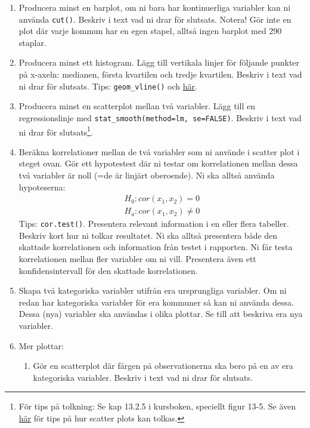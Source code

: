 \documentclass[swedish,english]{article}\usepackage[]{graphicx}\usepackage[]{xcolor}
\begin{document}
\begin{enumerate}
\item Producera minst en barplot, om ni bara har kontinuerliga variabler
kan ni använda \texttt{cut()}. Beskriv i text vad ni drar för slutsats.
Notera! Gör inte en plot där varje kommun har en egen stapel, alltså
ingen barplot med 290 staplar.
\item Producera minst ett histogram. Lägg till vertikala linjer för följande
punkter på x-axeln: medianen, första kvartilen och tredje kvartilen.
Beskriv i text vad ni drar för slutsats. Tips: \texttt{geom\_vline()}
och \href{http://www.sthda.com/english/wiki/ggplot2-add-straight-lines-to-a-plot-horizontal-vertical-and-regression-lines}{här}.
\item Producera minst en scatterplot mellan två variabler. Lägg till en
regressionslinje med \texttt{stat\_smooth(method=\textquotedbl lm\textquotedbl ,
se=FALSE)}. Beskriv i text vad ni drar för slutsats\footnote{För tips på tolkning: Se kap 13.2.5 i kursboken, speciellt figur 13-5.
Se även \href{https://chartio.com/learn/charts/what-is-a-scatter-plot/\#when-you-should-use-a-scatter-plot}{här}
för tips på hur scatter plots kan tolkas.}.
\item Beräkna korrelationer mellan de två variabler som ni använde i scatter
plot i steget ovan. Gör ett hypotestest där ni testar om korrelationen
mellan dessa två variabler är noll (=de är linjärt oberoende). Ni
ska alltså använda hypoteserna:
\[
\begin{array}{c}
H_{0}:cor\left(x_{1},x_{2}\right)=0\\
H_{a}:cor\left(x_{1},x_{2}\right)\ne0
\end{array}
\]
Tips: \texttt{cor.test()}. Presentera relevant information i en eller
flera tabeller. Beskriv kort hur ni tolkar resultatet. Ni ska alltså
presentera både den skattade korrelationen och information från testet
i rapporten. Ni får testa korrelationen mellan fler variabler om ni
vill. Presentera även ett konfidensintervall för den skattade korrelationen.
\item Skapa två kategoriska variabler utifrån era ursprungliga variabler.
Om ni redan har kategoriska variabler för era kommuner så kan ni använda
dessa. Dessa (nya) variabler ska användas i olika plottar. Se till
att beskriva era nya variabler.
\item Mer plottar:
\begin{enumerate}
\item Gör en scatterplot där färgen på observationerna ska bero på en av
era kategoriska variabler. Beskriv i text vad ni drar för slutsats.

\end{enumerate}
\end{enumerate}
\end{document}
